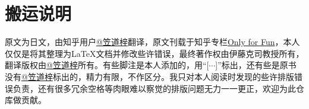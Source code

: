 \section*{搬运说明}

原文为日文，由知乎用户\href{https://www.zhihu.com/people/wo-bei-56}{@笠道梓}翻译，原文刊载于知乎专栏\href{https://www.zhihu.com/column/c_1245739225699885056}{Only for Fun}，本人仅仅是将其整理为\LaTeX 文档并修改些许错误，最终著作权由伊藤克司教授所有，翻译版权由\href{https://www.zhihu.com/people/wo-bei-56}{@笠道梓}所有。有些脚注是本人添加的，用“[$\cdots$]”标出，还有些是原书没有\href{https://www.zhihu.com/people/wo-bei-56}{@笠道梓}标出的，精力有限，不作区分。我只对本人阅读时发现的些许排版错误负责，还有很多冗余空格等肉眼难以察觉的排版问题无力一一更正，欢迎为此仓库做贡献。

